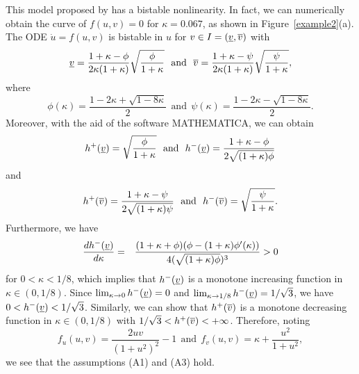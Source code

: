 \documentclass[a4,10pt]{article}
\begin{document}
This model proposed by \cite{MJE2} has a bistable nonlinearity. In fact, 
we can numerically obtain the curve of $f(u,v) = 0$ for $\kappa = 0.067$, 
as shown in Figure~\ref{example2}(a). 
%
The ODE $\dot{u} = f(u, v)$  is bistable in $u$ for $v \in I = (\underline{v}, \overline{v})$ with  
$$
\displaystyle{ \underline{v} = \frac{1 + \kappa - \phi}{2 \kappa (1+\kappa) }  \sqrt{ \frac{\phi}{1+ \kappa} } }
\ \ \text{and} \ \  
\displaystyle{ \overline{v} = \frac{1 + \kappa - \psi}{2 \kappa (1+\kappa) }
 \sqrt{ \frac{\psi}{1+ \kappa} } },
$$
where 
$$
\displaystyle{  \phi(\kappa) = \frac{1 - 2 \kappa + \sqrt{1-8 \kappa} }{2}  }
\ \ \text{and} \ \  
\displaystyle{  \psi(\kappa) = \frac{1 - 2 \kappa - \sqrt{1-8 \kappa} }{2}  } .
$$
Moreover, with the aid of the software MATHEMATICA, 
we can obtain
$$
\displaystyle{ h^+(\un{v}) =  \sqrt{ \frac{\phi}{1+ \kappa} }}
\ \ \text{and} \ \ 
\displaystyle{ h^-(\un{v}) = \frac{1 + \kappa - \phi }{2 \sqrt{(1 + \kappa) \phi}} }
$$
and
$$
\displaystyle{ h^+(\ov{v}) = \frac{1 + \kappa - \psi }{2 \sqrt{(1 + \kappa) \psi}} }
\ \ \text{and} \ \ 
\displaystyle{ h^-(\ov{v}) =  \sqrt{ \frac{\psi}{1+ \kappa} }}.
$$
%
Furthermore, we have
\begin{eqnarray*}
\displaystyle{ \frac{d h^-(\underline{v})}{d \kappa} } & = & 
\displaystyle{\frac{(1+\kappa + \phi)(\phi - (1+\kappa) \phi'(\kappa))}{4 (\sqrt{(1+\kappa) \phi})^3}} > 0
\end{eqnarray*}
%
for $0 < \kappa < 1/ 8$, which implies that $h^-(\underline{v})$ is 
a monotone increasing function in $\kappa \in (0, 1/8)$.
Since $\lim_{\kappa \to 0}  h^-(\underline{v}) = 0$ 
and $\lim_{\kappa \to 1/8}  h^-(\underline{v}) = 1/ \sqrt{3}$, 
we have $0 < h^-(\underline{v}) < 1/\sqrt{3}$. Similarly, we can show that $h^+(\overline{v})$ is a monotone decreasing function in $\kappa \in (0, 1/8)$ with $1/\sqrt{3} < h^+(\overline{v}) < +\infty $. 
Therefore, noting
$$
\displaystyle{f_u(u, v) = \frac{2 u v}{(1+u^2)^2}-1}
\ \ \text{and} \ \ 
\displaystyle{f_v(u, v) = \kappa + \frac{u^2}{1+u^2}},
$$
we see that the assumptions (A1) and (A3) hold.
\end{document}
